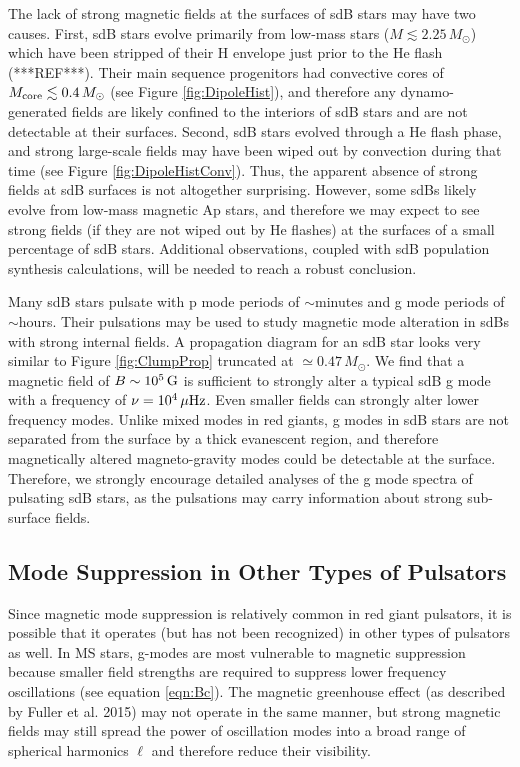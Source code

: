 The lack of strong magnetic fields at the surfaces of sdB stars may have two causes. First, sdB stars evolve primarily from low-mass stars ($M \lesssim 2.25 \, M_\odot$) which have been stripped of their H envelope just prior to the He flash (***REF***). Their main sequence progenitors had convective cores of $M_{\rm core} \lesssim 0.4 \, M_\odot$ (see Figure \ref{fig:DipoleHist}), and therefore any dynamo-generated fields are likely confined to the interiors of sdB stars and are not detectable at their surfaces. Second, sdB stars evolved through a He flash phase, and strong large-scale fields may have been wiped out by convection during that time (see Figure \ref{fig:DipoleHistConv}). Thus, the apparent absence of strong fields at sdB surfaces is not altogether surprising. However, some sdBs likely evolve from low-mass magnetic Ap stars, and therefore we may expect to see strong fields (if they are not wiped out by He flashes) at the surfaces of a small percentage of sdB stars. Additional observations, coupled with sdB population synthesis calculations, will be needed to reach a robust conclusion.

Many sdB stars pulsate with p mode periods of $\sim \!$minutes and g mode periods of $\sim \!$hours. Their pulsations may be used to study magnetic mode alteration in sdBs with strong internal fields. A propagation diagram for an sdB star looks very similar to Figure \ref{fig:ClumpProp} truncated at $\simeq 0.47 \, M_\odot$. We find that a magnetic field of $B\sim 10^5 \, {\rm G}$ is sufficient to strongly alter a typical sdB g mode with a frequency of $\nu = 10^4 \, \mu {\rm Hz}$. Even smaller fields can strongly alter lower frequency modes. Unlike mixed modes in red giants, g modes in sdB stars are not separated from the surface by a thick evanescent region, and therefore magnetically altered magneto-gravity modes could be detectable at the surface. Therefore, we strongly encourage detailed analyses of the g mode spectra of pulsating sdB stars, as the pulsations may carry information about strong sub-surface fields. 



\subsection{Mode Suppression in Other Types of Pulsators}
  
Since magnetic mode suppression is relatively common in red giant pulsators, it is possible that it operates (but has not been recognized) in other types of pulsators as well. In MS stars, g-modes are most vulnerable to magnetic suppression because smaller field strengths are required to suppress lower frequency oscillations (see equation \ref{eqn:Bc}). The magnetic greenhouse effect (as described by Fuller et al. 2015) may not operate in the same manner, but strong magnetic fields may still spread the power of oscillation modes into a broad range of spherical harmonics $\ell$ and therefore reduce their visibility. 

